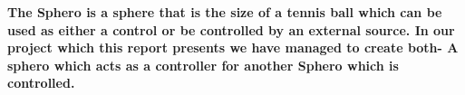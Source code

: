 \bf{The Sphero is a sphere that is the size of a tennis ball which can be used as either a control or be controlled by an external source. In our project which this report presents we have managed to create both-  A sphero which acts as a controller for another Sphero which is controlled.}
